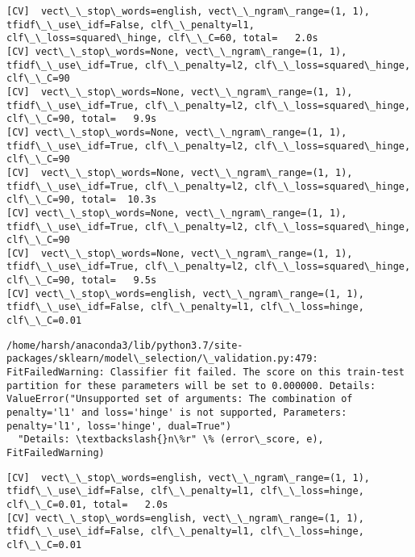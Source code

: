 \documentclass[11pt]{article}
\begin{document}
    \begin{Verbatim}[commandchars=\\\{\}]
[CV]  vect\_\_stop\_words=english, vect\_\_ngram\_range=(1, 1), tfidf\_\_use\_idf=False, clf\_\_penalty=l1, clf\_\_loss=squared\_hinge, clf\_\_C=60, total=   2.0s
[CV] vect\_\_stop\_words=None, vect\_\_ngram\_range=(1, 1), tfidf\_\_use\_idf=True, clf\_\_penalty=l2, clf\_\_loss=squared\_hinge, clf\_\_C=90 
[CV]  vect\_\_stop\_words=None, vect\_\_ngram\_range=(1, 1), tfidf\_\_use\_idf=True, clf\_\_penalty=l2, clf\_\_loss=squared\_hinge, clf\_\_C=90, total=   9.9s
[CV] vect\_\_stop\_words=None, vect\_\_ngram\_range=(1, 1), tfidf\_\_use\_idf=True, clf\_\_penalty=l2, clf\_\_loss=squared\_hinge, clf\_\_C=90 
[CV]  vect\_\_stop\_words=None, vect\_\_ngram\_range=(1, 1), tfidf\_\_use\_idf=True, clf\_\_penalty=l2, clf\_\_loss=squared\_hinge, clf\_\_C=90, total=  10.3s
[CV] vect\_\_stop\_words=None, vect\_\_ngram\_range=(1, 1), tfidf\_\_use\_idf=True, clf\_\_penalty=l2, clf\_\_loss=squared\_hinge, clf\_\_C=90 
[CV]  vect\_\_stop\_words=None, vect\_\_ngram\_range=(1, 1), tfidf\_\_use\_idf=True, clf\_\_penalty=l2, clf\_\_loss=squared\_hinge, clf\_\_C=90, total=   9.5s
[CV] vect\_\_stop\_words=english, vect\_\_ngram\_range=(1, 1), tfidf\_\_use\_idf=False, clf\_\_penalty=l1, clf\_\_loss=hinge, clf\_\_C=0.01 

    \end{Verbatim}

    \begin{Verbatim}[commandchars=\\\{\}]
/home/harsh/anaconda3/lib/python3.7/site-packages/sklearn/model\_selection/\_validation.py:479: FitFailedWarning: Classifier fit failed. The score on this train-test partition for these parameters will be set to 0.000000. Details: 
ValueError("Unsupported set of arguments: The combination of penalty='l1' and loss='hinge' is not supported, Parameters: penalty='l1', loss='hinge', dual=True")
  "Details: \textbackslash{}n\%r" \% (error\_score, e), FitFailedWarning)

    \end{Verbatim}

    \begin{Verbatim}[commandchars=\\\{\}]
[CV]  vect\_\_stop\_words=english, vect\_\_ngram\_range=(1, 1), tfidf\_\_use\_idf=False, clf\_\_penalty=l1, clf\_\_loss=hinge, clf\_\_C=0.01, total=   2.0s
[CV] vect\_\_stop\_words=english, vect\_\_ngram\_range=(1, 1), tfidf\_\_use\_idf=False, clf\_\_penalty=l1, clf\_\_loss=hinge, clf\_\_C=0.01 

    \end{Verbatim}
\end{document}

